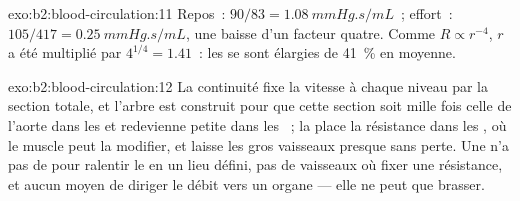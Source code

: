 \begin{solution}{exo:b2:blood-circulation:11}
Repos~: $90/83 = \qty{1.08}{mmHg.s/mL}$~; effort~: $105/417 =
\qty{0.25}{mmHg.s/mL}$, une baisse d'un facteur quatre. Comme
$R \propto r^{-4}$, $r$ a été multiplié par $4^{1/4} = 1.41$~: les
 se sont élargies de \qty{41}{\%} en moyenne.
\end{solution}

\begin{solution}{exo:b2:blood-circulation:12}
La continuité fixe la vitesse à chaque niveau par la section totale, et
l'arbre est construit pour que cette section soit mille fois celle de
l'aorte dans les  et redevienne petite dans les ~; la
 place la résistance dans les , où le muscle
peut la modifier, et laisse les gros vaisseaux presque sans perte. Une
 n'a pas de  pour ralentir le  en un
lieu défini, pas de vaisseaux où fixer une résistance, et aucun moyen
de diriger le débit vers un organe --- elle ne peut que brasser.
\end{solution}

